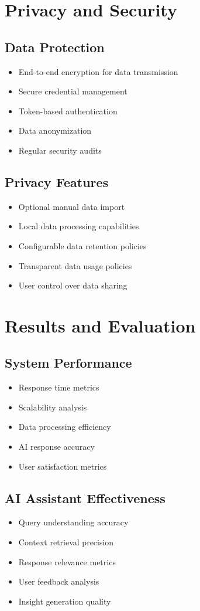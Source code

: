 \documentclass[conference]{IEEEtran}
\begin{document}
\section{Privacy and Security}
\subsection{Data Protection}
\begin{itemize}
\item End-to-end encryption for data transmission
\item Secure credential management
\item Token-based authentication
\item Data anonymization
\item Regular security audits
\end{itemize}

\subsection{Privacy Features}
\begin{itemize}
\item Optional manual data import
\item Local data processing capabilities
\item Configurable data retention policies
\item Transparent data usage policies
\item User control over data sharing
\end{itemize}

\section{Results and Evaluation}
\subsection{System Performance}
\begin{itemize}
\item Response time metrics
\item Scalability analysis
\item Data processing efficiency
\item AI response accuracy
\item User satisfaction metrics
\end{itemize}

\subsection{AI Assistant Effectiveness}
\begin{itemize}
\item Query understanding accuracy
\item Context retrieval precision
\item Response relevance metrics
\item User feedback analysis
\item Insight generation quality
\end{itemize}
\end{document}
